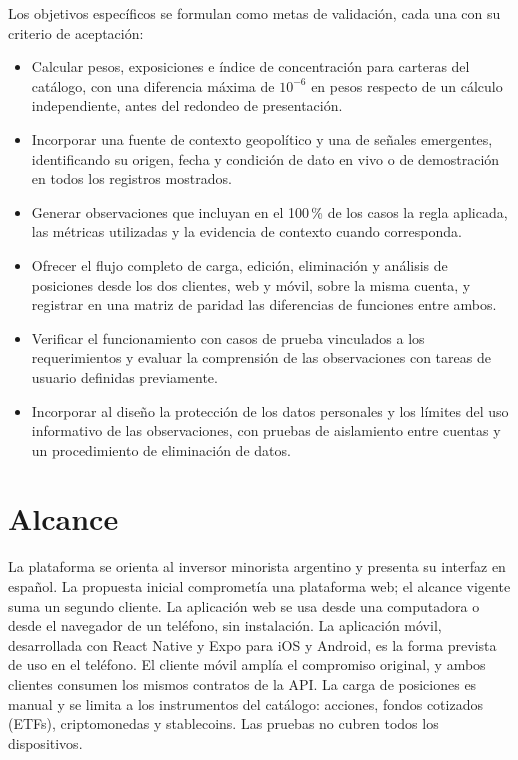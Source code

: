 Los objetivos específicos se formulan como metas de validación, cada una con su criterio de aceptación:
\begin{itemize}
\item Calcular pesos, exposiciones e índice de concentración para carteras del catálogo, con una diferencia máxima de $10^{-6}$ en pesos respecto de un cálculo independiente, antes del redondeo de presentación.
\item Incorporar una fuente de contexto geopolítico y una de señales emergentes, identificando su origen, fecha y condición de dato en vivo o de demostración en todos los registros mostrados.
\item Generar observaciones que incluyan en el 100\,\% de los casos la regla aplicada, las métricas utilizadas y la evidencia de contexto cuando corresponda.
\item Ofrecer el flujo completo de carga, edición, eliminación y análisis de posiciones desde los dos clientes, web y móvil, sobre la misma cuenta, y registrar en una matriz de paridad las diferencias de funciones entre ambos.
\item Verificar el funcionamiento con casos de prueba vinculados a los requerimientos y evaluar la comprensión de las observaciones con tareas de usuario definidas previamente.
\item Incorporar al diseño la protección de los datos personales y los límites del uso informativo de las observaciones, con pruebas de aislamiento entre cuentas y un procedimiento de eliminación de datos.
\end{itemize}

\section{Alcance}\label{sec:alcance}

La plataforma se orienta al inversor minorista argentino y presenta su interfaz en español. La propuesta inicial comprometía una plataforma web; el alcance vigente suma un segundo cliente. La aplicación web se usa desde una computadora o desde el navegador de un teléfono, sin instalación. La aplicación móvil, desarrollada con React Native y Expo para iOS y Android, es la forma prevista de uso en el teléfono. El cliente móvil amplía el compromiso original, y ambos clientes consumen los mismos contratos de la API. La carga de posiciones es manual y se limita a los instrumentos del catálogo: acciones, fondos cotizados (ETFs), criptomonedas y stablecoins. Las pruebas no cubren todos los dispositivos.

